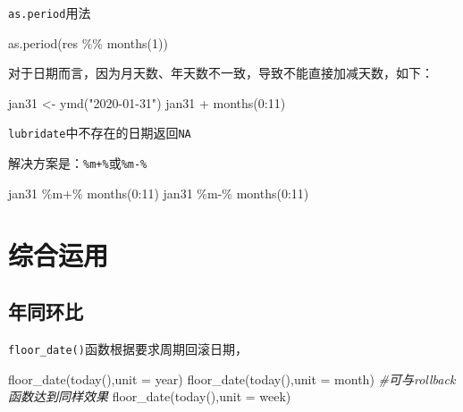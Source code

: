 \documentclass[
]{book}
\newenvironment{Shaded}{\begin{snugshade}}{\end{snugshade}}
\newcommand{\AttributeTok}[1]{\textcolor[rgb]{0.77,0.63,0.00}{#1}}
\newcommand{\CommentTok}[1]{\textcolor[rgb]{0.56,0.35,0.01}{\textit{#1}}}
\newcommand{\DecValTok}[1]{\textcolor[rgb]{0.00,0.00,0.81}{#1}}
\newcommand{\FunctionTok}[1]{\textcolor[rgb]{0.00,0.00,0.00}{#1}}
\newcommand{\NormalTok}[1]{#1}
\newcommand{\OtherTok}[1]{\textcolor[rgb]{0.56,0.35,0.01}{#1}}
\newcommand{\SpecialCharTok}[1]{\textcolor[rgb]{0.00,0.00,0.00}{#1}}
\newcommand{\StringTok}[1]{\textcolor[rgb]{0.31,0.60,0.02}{#1}}
\begin{document}
\texttt{as.period}用法

\begin{Shaded}
\begin{Highlighting}[]
\FunctionTok{as.period}\NormalTok{(res }\SpecialCharTok{\%\%} \FunctionTok{months}\NormalTok{(}\DecValTok{1}\NormalTok{))}
\end{Highlighting}
\end{Shaded}

对于日期而言，因为月天数、年天数不一致，导致不能直接加减天数，如下：

\begin{Shaded}
\begin{Highlighting}[]
\NormalTok{jan31 }\OtherTok{\textless{}{-}} \FunctionTok{ymd}\NormalTok{(}\StringTok{"2020{-}01{-}31"}\NormalTok{)}
\NormalTok{jan31 }\SpecialCharTok{+} \FunctionTok{months}\NormalTok{(}\DecValTok{0}\SpecialCharTok{:}\DecValTok{11}\NormalTok{)}
\end{Highlighting}
\end{Shaded}

\texttt{lubridate}中不存在的日期返回\texttt{NA}

解决方案是：\texttt{\%m+\%}或\texttt{\%m-\%}

\begin{Shaded}
\begin{Highlighting}[]
\NormalTok{jan31 }\SpecialCharTok{\%m+\%} \FunctionTok{months}\NormalTok{(}\DecValTok{0}\SpecialCharTok{:}\DecValTok{11}\NormalTok{)}
\NormalTok{jan31 }\SpecialCharTok{\%m{-}\%} \FunctionTok{months}\NormalTok{(}\DecValTok{0}\SpecialCharTok{:}\DecValTok{11}\NormalTok{)}
\end{Highlighting}
\end{Shaded}

\hypertarget{ux7efcux5408ux8fd0ux7528-1}{%
\section{综合运用}\label{ux7efcux5408ux8fd0ux7528-1}}

\hypertarget{ux5e74ux540cux73afux6bd4}{%
\subsection{年同环比}\label{ux5e74ux540cux73afux6bd4}}

\texttt{floor\_date()}函数根据要求周期回滚日期，

\begin{Shaded}
\begin{Highlighting}[]
\FunctionTok{floor\_date}\NormalTok{(}\FunctionTok{today}\NormalTok{(),}\AttributeTok{unit =} \StringTok{\textquotesingle{}year\textquotesingle{}}\NormalTok{)}
\FunctionTok{floor\_date}\NormalTok{(}\FunctionTok{today}\NormalTok{(),}\AttributeTok{unit =} \StringTok{\textquotesingle{}month\textquotesingle{}}\NormalTok{) }\CommentTok{\#可与rollback函数达到同样效果}
\FunctionTok{floor\_date}\NormalTok{(}\FunctionTok{today}\NormalTok{(),}\AttributeTok{unit =} \StringTok{\textquotesingle{}week\textquotesingle{}}\NormalTok{)}
\end{Highlighting}
\end{Shaded}
\end{document}
